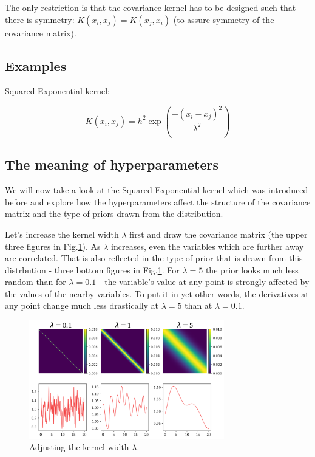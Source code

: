 \documentclass[10pt,twocolumn]{article}
\newcommand\pythonstyle{\lstset{
language=Python,
basicstyle=\ttm,
otherkeywords={self},             %
keywordstyle=\ttb\color{deepblue},
emph={MyClass,__init__},          %
emphstyle=\ttb\color{deepred},    %
stringstyle=\color{deepgreen},
frame=tb,                         %
showstringspaces=false            %
}}
\newcommand\pythoninline[1]{{\pythonstyle\lstinline!#1!}}
\begin{document}
The only restriction is that the covariance kernel has to be designed such that there is symmetry: $K(x_i, x_j) = K(x_j, x_i)$ (to assure symmetry of the covariance matrix).


\subsection{Examples}

Squared Exponential kernel:

\begin{equation}
K(x_i, x_j) = h^2 \exp(\frac{- (x_i - x_j)^2}{\lambda^2})
\end{equation}


\subsection{The meaning of hyperparameters} \label{sec:meaning-of-hyp}

We will now take a look at the Squared Exponential kernel which was introduced before and explore how the hyperparameters affect the structure of the covariance matrix and the type of priors drawn from the distribution.


Let's increase the kernel width $\lambda$ first and draw the covariance matrix (the upper three figures in Fig.\ref{fig:SE-kernel-width}). As $\lambda$ increases, even the variables which are further away are correlated. That is also reflected in the type of prior that is drawn from this distrbution - three bottom figures in Fig.\ref{fig:SE-kernel-width}. For $\lambda = 5$ the prior looks much less random than for $\lambda = 0.1$ - the variable's value at any point is strongly affected by the values of the nearby variables. To put it in yet other words, the derivatives at any point change much less drastically at $\lambda = 5$ than at $\lambda = 0.1$.

\begin{figure}[H]
\centering\includegraphics[width=8.5cm]{cov-Kernel-SE-changing-lambda-tex.png}
\caption{Adjusting the kernel width $\lambda$.}
\label{fig:SE-kernel-width}
\end{figure}
\end{document}
